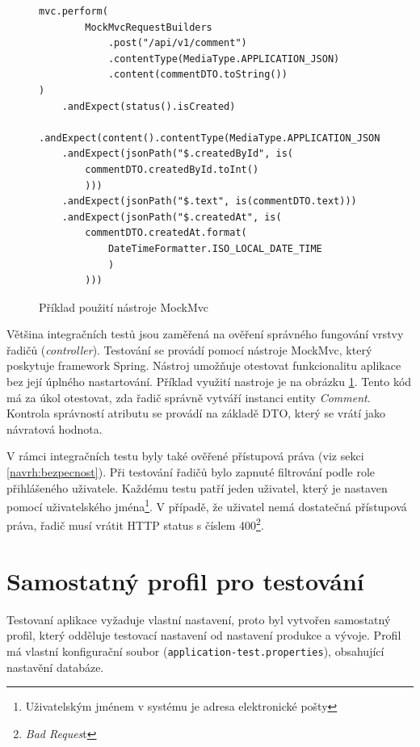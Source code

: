         \begin{figure}
        \begin{verbatim}
mvc.perform(
        MockMvcRequestBuilders
            .post("/api/v1/comment")
            .contentType(MediaType.APPLICATION_JSON)
            .content(commentDTO.toString())
)
    .andExpect(status().isCreated)
    .andExpect(content().contentType(MediaType.APPLICATION_JSON))
    .andExpect(jsonPath("$.createdById", is(
        commentDTO.createdById.toInt()
        )))
    .andExpect(jsonPath("$.text", is(commentDTO.text)))
    .andExpect(jsonPath("$.createdAt", is(
        commentDTO.createdAt.format(
            DateTimeFormatter.ISO_LOCAL_DATE_TIME
            )
        )))

        \end{verbatim}
        \caption{Příklad použití nástroje MockMvc} 
        \label{code:mockmvc}
    \end{figure}
    Většina integračních testů jsou zaměřená na ověření správného fungování vrstvy řadičů (\textit{controller}). Testování se provádí pomocí nástroje MockMvc\cite{mock-mvc}, který poskytuje framework Spring. Nástroj umožňuje otestovat funkcionalitu aplikace bez její úplného nastartování. Příklad využití nastroje je na obrázku \ref{code:mockmvc}. Tento kód má za úkol otestovat, zda řadič správně vytváří instanci entity \textit{Comment}. Kontrola správností atributu se provádí na základě DTO, který se vrátí jako návratová hodnota.
    
    V rámci integračních testu byly také ověřené přístupová práva (viz sekci \ref{navrh:bezpecnost}). Při testování řadičů bylo zapnuté filtrování podle role přihlášeného uživatele. Každému testu patří jeden uživatel, který je nastaven pomocí uživatelského jména\footnote{Uživatelským jménem v systému je adresa elektronické pošty}. V případě, že uživatel nemá dostatečná přístupová práva, řadič musí vrátit HTTP status s číslem 400\footnote{\textit{Bad Reques}t}.
    
\section{Samostatný profil pro testování}

    Testovaní aplikace vyžaduje vlastní nastavení, proto byl vytvořen samostatný profil, který odděluje testovací nastavení od nastavení produkce a vývoje. Profil má vlastní konfigurační soubor (\verb|application-test.properties|), obsahující nastavění databáze.
    
